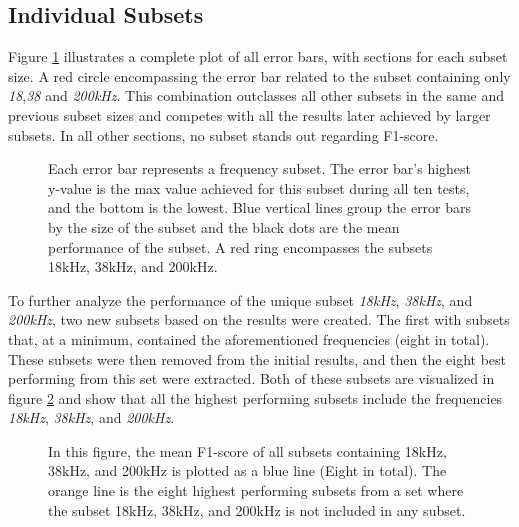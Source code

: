     \subsection{Individual Subsets}
        Figure \ref{errorbar_fig} illustrates a complete plot of all error bars, with sections for each subset size. A red circle encompassing the error bar related to the subset containing only \textit{18},\textit{38} and \textit{200kHz}. This combination outclasses all other subsets in the same and previous subset sizes and competes with all the results later achieved by larger subsets. In all other sections, no subset stands out regarding F1-score.
        \clearpage
        \begin{figure}[H]
            \centering
                        
            \caption[Error bars per combination]{Each error bar represents a frequency subset. The error bar's highest y-value is the max value achieved for this subset during all ten tests, and the bottom is the lowest. Blue vertical lines group the error bars by the size of the subset and the black dots are the mean performance of the subset. A red ring encompasses the subsets 18kHz, 38kHz, and 200kHz.}
          	\medskip 
            \label{errorbar_fig}
        \end{figure}
    
        To further analyze the performance of the unique subset \textit{18kHz}, \textit{38kHz}, and \textit{200kHz}, two new subsets based on the results were created. The first with subsets that, at a minimum, contained the aforementioned frequencies (eight in total). These subsets were then removed from the initial results, and then the eight best performing from this set were extracted. Both of these subsets are visualized in figure \ref{with_without_figure} and show that all the highest performing subsets include the frequencies \textit{18kHz}, \textit{38kHz}, and \textit{200kHz}.
        
        \begin{figure}[H]
            \centering
            
            \caption[With and without unique subset]{In this figure, the mean F1-score of all subsets containing 18kHz, 38kHz, and 200kHz is plotted as a blue line (Eight in total). The orange line is the eight highest performing subsets from a set where the subset 18kHz, 38kHz, and 200kHz is not included in any subset.}
          	\medskip 
            \label{with_without_figure}
        \end{figure}
        
